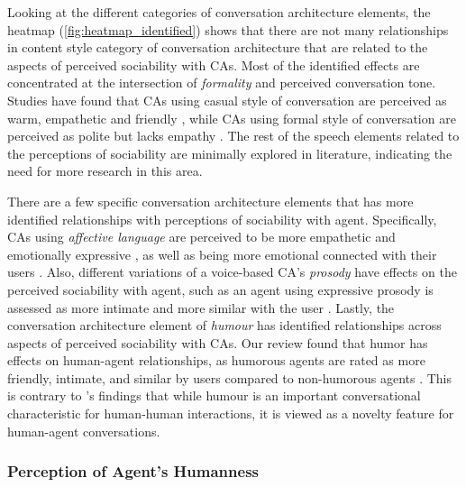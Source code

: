 Looking at the different categories of conversation architecture elements, the heatmap (\autoref{fig:heatmap_identified}) shows that there are not many relationships in content style category of conversation architecture that are related to the aspects of perceived sociability with CAs. Most of the identified effects are concentrated at the intersection of \textit{formality} and perceived conversation tone. Studies have found that CAs using casual style of conversation are perceived as warm, empathetic and friendly \cite{jestin2022effects, kim2019comparing}\cmt{[81][89]}, while CAs using formal style of conversation are perceived as polite but lacks empathy \cite{cox2022does}\cmt{[27]}. The rest of the speech elements related to the perceptions of sociability are minimally explored in literature, indicating the need for more research in this area.

There are a few specific conversation architecture elements that has more identified relationships with perceptions of sociability with agent. Specifically, CAs using \textit{affective language} are perceived to be more empathetic \cite{daher2020empathic, diederich2019emulating, yang2017perceived}\cmt{[58][25][44]} and emotionally expressive \cite{zhu2022effects}\cmt{[26]}, as well as being more emotional connected with their users \cite{lee2019s, lubis2019positive}\cmt{[55][43]}. Also, different variations of a voice-based CA's \textit{prosody} have effects on the perceived sociability with agent, such as an agent using expressive prosody is assessed as more intimate and more similar with the user \cite{kim2020can}\cmt{[24]}. Lastly, the conversation architecture element of \textit{humour} has identified relationships across aspects of perceived sociability with CAs. Our review found that humor has effects on human-agent relationships, as humorous agents are rated as more friendly, intimate, and similar by users compared to non-humorous agents \cite{go2021conversational, khooshabeh2011does}\cmt{[80][37]}. This is contrary to \citet{clark2019makes}'s findings that while humour is an important conversational characteristic for human-human interactions, it is viewed as a novelty feature for human-agent conversations.


\subsubsection{Perception of Agent's Humanness}

